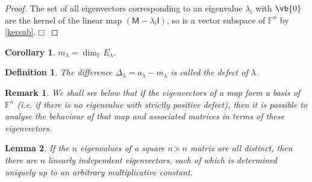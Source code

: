 \documentclass{article}
\theoremstyle{plain}\theoremheaderfont{\normalfont\itshape}\theorembodyfont{\rmfamily}\theoremseparator{.}\newtheorem*{rem}{Remark}\newtheorem*{ex}{Example}\newtheorem*{proof}{Proof}\newtheorem*{altp}{Alternative proof}
\theoremstyle{plain}\theoremheaderfont{\normalfont\bfseries}\theorembodyfont{\rmfamily}\theoremseparator{.}\newtheorem{thm}{Theorem}[section]\newtheorem{lem}[thm]{Lemma}\newtheorem{prop}[thm]{Proposition}\newtheorem*{cor}{Corollary}\newtheorem{defn}[thm]{Definition}\newtheorem{clm}[thm]{Claim}\newtheorem{clminproof}{Claim}
\theoremstyle{break}\theoremheaderfont{\normalfont\itshape}\theorembodyfont{\rmfamily}\theoremseparator{.\medskip}\newtheorem*{proofskip}{Proof}\newtheorem*{exs}{Examples}\newtheorem*{rems}{Remarks}
\theoremstyle{break}\theoremheaderfont{\normalfont\bfseries}\theorembodyfont{\rmfamily}\theoremseparator{.\medskip}\newtheorem{lemskip}[thm]{Lemma}\newtheorem{defnskip}[thm]{Definition}\newtheorem{propskip}[thm]{Proposition}\newtheorem{thmskip}[thm]{Theorem}
\numberwithin{equation}{section}
\newcommand{\qed}{\hfill\ensuremath{\Box}}
\begin{document}
	\begin{proof}
		The set of all eigenvectors corresponding to an eigenvalue \(\lambda_i\) with \(\vb{0}\) are the kernel of the linear map \((\mathsf{M}-\lambda_i\mathsf{I})\), so is a vector subspace of \(\mathbb{F}^n\) by \cref{kersub}.\qed
	\end{proof}
	\begin{cor}
		\(m_\lambda =\dim_\mathbb{F} E_\lambda\).
	\end{cor}
	\begin{defn}
		The difference \(\Delta_\lambda=a_\lambda -m_\lambda\) is called the \textit{defect} of \(\lambda\).
	\end{defn}
	\begin{rem}
		We shall see below that if the eigenvectors of a map form a basis of \(\mathbb{F}^n\) (i.e. if there is no eigenvalue with strictly positive defect), then it is possible to analyse the behaviour of that map and associated matrices in terms of these eigenvectors.
	\end{rem}	
	\begin{lem}
		If the \(n\) eigenvalues of a square \(n\times n\) matrix are all distinct, then there are \(n\) linearly independent eigenvectors, each of which is determined uniquely up to an arbitrary multiplicative constant.
	\end{lem}
\end{document}
